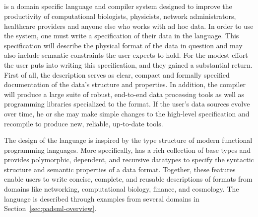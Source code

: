 
\subsection{\padsmlbig{}}


\padsml{} is a domain specific language and compiler system designed to 
improve the productivity of computational biologists, physicists,
network administrators, healthcare providers
and anyone else who works with ad hoc data.
In order to use the system, one must
write a specification of their data in the \padsml{} language.
This specification will describe the physical format of the data in question
and may also include semantic constraints the user expects to hold.
For the modest effort the user puts into writing this specification,
and they gained a substantial return.  First of all, the description
serves as clear, compact and formally specified documentation of 
the data's structure and properties.  In addition, the \padsml{}
compiler will produce a large suite of robust, end-to-end
data processing tools as well as programming libraries specialized
to the format.  If the user's data sources evolve over time,
he or she may make simple changes to the high-level specification
and recompile to produce new, reliable, up-to-date tools.



The design of the 
\padsml{} language is inspired by the type structure of modern
functional programming languages.  More specifically, 
\padsml{} has a rich collection of base
types and provides polymorphic, dependent, and recursive datatypes to
specify the syntactic structure and semantic properties of a data
format.  Together, these features enable users to write concise,
complete, and reusable descriptions of formats from domains like
networking, computational biology, finance, and cosmology.  The
\padsml{} language is described through examples from several domains
in Section~\ref{sec:padsml-overview}.


